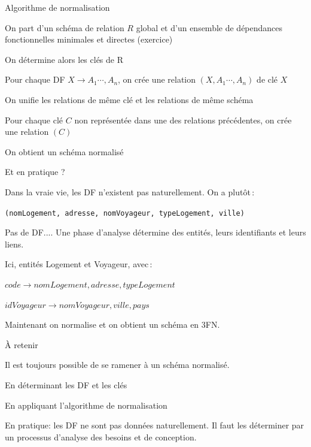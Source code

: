 \begin{frame}{Algorithme de normalisation}

On part d’un schéma de relation $R$ \alert{global}
et d’un ensemble de dépendances fonctionnelles \alert{minimales} et \alert{directes} (exercice)

\vfill

On détermine alors les clés de R

\vfill 
\begin{redbullet}
  \item Pour chaque DF $X \to A_1 \cdots, A_n$,
      on crée une relation $(X,A_1 \cdots, A_n)$ de clé $X$
     \item On unifie les relations de même clé et les relations de même schéma
  \item Pour chaque clé $C$
non représentée dans une des relations précédentes, on crée une relation $(C)$
\end{redbullet}

\vfill

\alert{On obtient un schéma normalisé}
\end{frame}


\begin{frame}{Et en pratique ?}

Dans la vraie vie, les DF n'existent pas naturellement. On a plutôt\,:

\vfill
\begin{small}
\texttt{(nomLogement, adresse, nomVoyageur, typeLogement, ville)}
\end{small}
\vfill 

Pas de DF.... Une phase d'analyse détermine 
des \alert{entités}, leurs identifiants et 
leurs liens.

\vfill

Ici, entités Logement et Voyageur, avec\,:

\begin{redbullet}
  \item $code \to nomLogement, adresse, typeLogement$
    \item $idVoyageur \to nomVoyageur, ville, pays$
  
\end{redbullet}

Maintenant on normalise et on obtient un schéma en 3FN.
\end{frame}

\begin{frame}{À retenir}

Il est toujours possible de se ramener à un schéma normalisé.

\vfill
\begin{redbullet}
   \item En déterminant les DF et les clés
   \item En appliquant l'algorithme de normalisation
\end{redbullet}

\vfill

\alert{En pratique}: les DF ne sont pas données naturellement. Il faut les déterminer
par un processus d'analyse des besoins et de  conception.


\end{frame}

